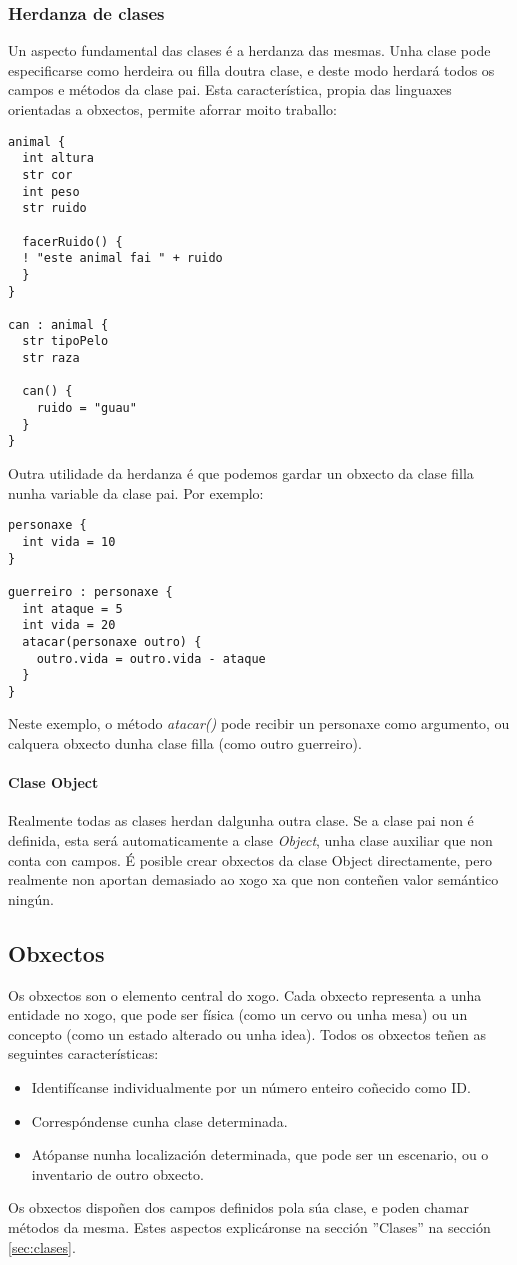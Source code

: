 \subsubsection{Herdanza de clases}
Un aspecto fundamental das clases é a herdanza das mesmas. Unha clase pode
especificarse como herdeira ou filla doutra clase, e deste modo herdará todos os
campos e métodos da clase pai. Esta característica, propia das linguaxes
orientadas a obxectos, permite aforrar moito traballo:
\begin{lstlisting}
animal {
  int altura
  str cor
  int peso
  str ruido
  
  facerRuido() {
  ! "este animal fai " + ruido
  }
}

can : animal {
  str tipoPelo
  str raza
  
  can() {
    ruido = "guau"
  }
}
\end{lstlisting}
\par
Outra utilidade da herdanza é que podemos gardar un obxecto da clase filla nunha
variable da clase pai. Por exemplo:
\begin{lstlisting}
personaxe {
  int vida = 10
}

guerreiro : personaxe {
  int ataque = 5
  int vida = 20
  atacar(personaxe outro) {
    outro.vida = outro.vida - ataque 
  }
}
\end{lstlisting}
\par Neste exemplo, o método {\it atacar()} pode recibir un personaxe como
argumento, ou calquera obxecto dunha clase filla (como outro guerreiro).

\paragraph{Clase Object}
Realmente todas as clases herdan dalgunha outra clase. Se a clase pai non é
definida, esta será automaticamente a clase {\it Object}, unha clase auxiliar
que non conta con campos. É posible crear obxectos da clase Object
directamente, pero realmente non aportan demasiado ao xogo xa que non conteñen
valor semántico ningún.

\subsection{Obxectos}
\label{sec:obxectos}
Os obxectos son o elemento central do xogo. Cada obxecto representa a unha
entidade no xogo, que pode ser física (como un cervo ou unha mesa) ou un
concepto (como un estado alterado ou unha idea). Todos os obxectos teñen as
seguintes características:
\begin{itemize}
  \item Identifícanse individualmente por un número enteiro coñecido como ID.
  \item Correspóndense cunha clase determinada.
  \item Atópanse nunha localización determinada, que pode ser un escenario, ou o
  inventario de outro obxecto.
\end{itemize}
\par
Os obxectos dispoñen dos campos definidos pola súa clase, e poden chamar
métodos da mesma. Estes aspectos explicáronse na sección ''Clases'' na sección
\ref{sec:clases}.

